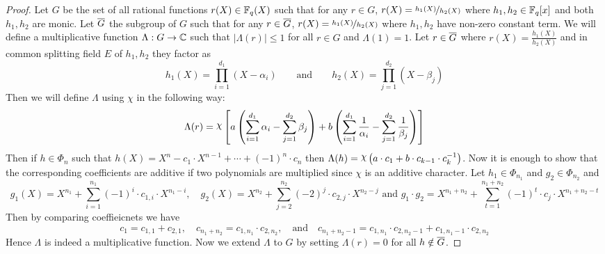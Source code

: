 \begin{proof}
  Let $G$ be the set of all rational functions $r(X)\in\mathbb{F}_q(X)$ such that for any $r\in G$, $r(X)=\nicefrac{h_1(X)}{h_2(X)}$ where $h_1,h_2\in\mathbb{F}_q[x]$ and both $h_1,h_2$ are monic. Let $\overline{G}$ the subgroup of $G$ such that for any $r\in \overline{G}$, $r(X)=\nicefrac{h_1(X)}{h_2(X)}$ where $h_1,h_2$ have non-zero constant term. We will define a multiplicative function $\Lambda:G\to \mathbb{C}$ such that $|\Lambda(r)|\leq 1$ for all $r\in G$ and $\Lambda(1)=1$. Let $r\in \overline{G}$ where $r(X)=\frac{h_1(X)}{h_2(X)}$ and in common splitting field $E$ of $h_1,h_2$ they factor as $$h_1(X)=\prod_{i=1}^{d_1}(X-\alpha_i)\qquad\text{and}\qquad h_2(X)=\prod_{j=1}^{d_2}(X-\beta_j)$$Then we will define $\Lambda$ using $\chi$ in the following way: \begin{equation}
    \Lambda(r)=\chi\lt[a\lt(\sum_{i=1}^{d_1}\alpha_i-\sum_{j=1}^{d_2}\beta_j  \rt) +b\lt( \sum_{i=1}^{d_1}\frac1{\alpha_i}-\sum_{j=1}^{d_2}\frac1{\beta_j} \rt)\rt]
  \end{equation}Then if $h\in\Phi_n$ such that $h(X)=X^n-c_1\cdot X^{n-1}+\cdots +(-1)^n\cdot c_n$ then $\Lambda(h)=\chi\lt(a\cdot c_1+b\cdot c_{k-1}\cdot c_k^{-1}\rt)$. Now it is enough to show that the corresponding coefficients are additive if two polynomials are multiplied since $\chi$ is an additive character. Let $h_1\in\Phi_{n_1}$ and $g_2\in \Phi_{n_2}$ and $$g_1(X)=X^{n_1}+\sum_{i=1}^{n_1}(-1)^i\cdot c_{1,i}\cdot X^{n_1-i},\quad g_2(X)=X^{n_2}+\sum_{j=2}^{n_2}(-2)^j\cdot c_{2,j}\cdot X^{n_2-j}\text{ and }g_1\cdot g_2=X^{n_1+n_2}+\sum_{t=1}^{n_1+n_2}(-1)^t\cdot c_j\cdot X^{n_1+n_2-t}$$Then by comparing coeffieicnets we have $$c_1=c_{1,1}+c_{2,1},\quad c_{n_1+n_2}=c_{1,n_1}\cdot c_{2,n_2},\quad\text{and}\quad c_{n_1+n_2-1}=c_{1,n_1}\cdot c_{2,n_2-1}+c_{1,n_1-1}\cdot c_{2,n_2}$$Hence $\Lambda$ is indeed a multiplicative function. Now we extend $\Lambda$ to $G$ by setting $\Lambda(r)=0$ for all $h\notin \overline{G}$. 


\end{proof}
